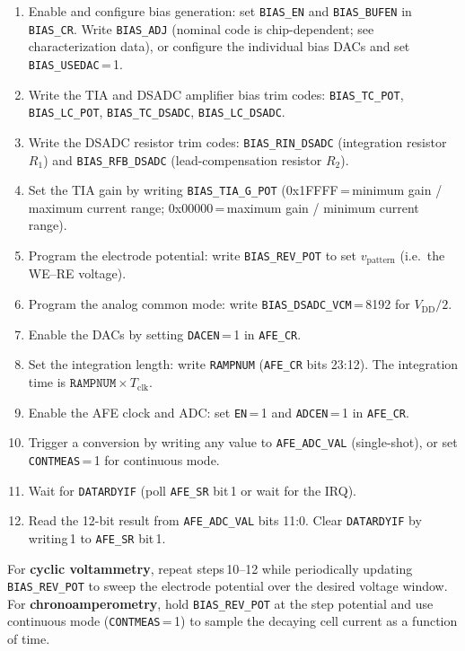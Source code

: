 \begin{enumerate}
    \item Enable and configure bias generation: set \texttt{BIAS\_EN} and \texttt{BIAS\_BUFEN} in \texttt{BIAS\_CR}. Write \texttt{BIAS\_ADJ} (nominal code is chip-dependent; see characterization data), or configure the individual bias DACs and set \texttt{BIAS\_USEDAC}\,=\,1.
    \item Write the TIA and DSADC amplifier bias trim codes: \texttt{BIAS\_TC\_POT}, \texttt{BIAS\_LC\_POT}, \texttt{BIAS\_TC\_DSADC}, \texttt{BIAS\_LC\_DSADC}.
    \item Write the DSADC resistor trim codes: \texttt{BIAS\_RIN\_DSADC} (integration resistor $R_1$) and \texttt{BIAS\_RFB\_DSADC} (lead-compensation resistor $R_2$).
    \item Set the TIA gain by writing \texttt{BIAS\_TIA\_G\_POT} (0x1FFFF\,=\,minimum gain / maximum current range; 0x00000\,=\,maximum gain / minimum current range).
    \item Program the electrode potential: write \texttt{BIAS\_REV\_POT} to set $v_\mathrm{pattern}$ (i.e.\ the WE--RE voltage).
    \item Program the analog common mode: write \texttt{BIAS\_DSADC\_VCM}\,=\,8192 for $V_\mathrm{DD}/2$.
    \item Enable the DACs by setting \texttt{DACEN}\,=\,1 in \texttt{AFE\_CR}.
    \item Set the integration length: write \texttt{RAMPNUM} (\texttt{AFE\_CR} bits 23:12). The integration time is $\mathtt{RAMPNUM} \times T_\mathrm{clk}$.
    \item Enable the AFE clock and ADC: set \texttt{EN}\,=\,1 and \texttt{ADCEN}\,=\,1 in \texttt{AFE\_CR}.
    \item Trigger a conversion by writing any value to \texttt{AFE\_ADC\_VAL} (single-shot), or set \texttt{CONTMEAS}\,=\,1 for continuous mode.
    \item Wait for \texttt{DATARDYIF} (poll \texttt{AFE\_SR} bit\,1 or wait for the IRQ).
    \item Read the 12-bit result from \texttt{AFE\_ADC\_VAL} bits 11:0. Clear \texttt{DATARDYIF} by writing\,1 to \texttt{AFE\_SR} bit\,1.
\end{enumerate}

For \textbf{cyclic voltammetry}, repeat steps\,10--12 while periodically updating \texttt{BIAS\_REV\_POT} to sweep the electrode potential over the desired voltage window. For \textbf{chronoamperometry}, hold \texttt{BIAS\_REV\_POT} at the step potential and use continuous mode (\texttt{CONTMEAS}\,=\,1) to sample the decaying cell current as a function of time.


